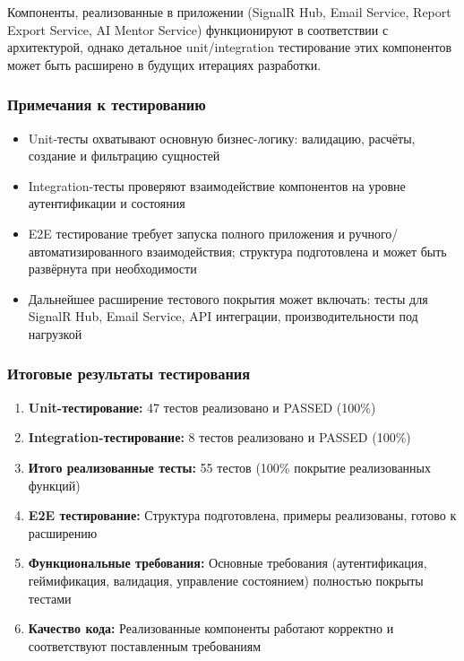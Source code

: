 Компоненты, реализованные в приложении (SignalR Hub, Email Service, Report Export Service, AI Mentor Service) функционируют в соответствии с архитектурой, однако детальное unit/integration тестирование этих компонентов может быть расширено в будущих итерациях разработки.

\subsubsection*{Примечания к тестированию}

\begin{itemize}
	\item Unit-тесты охватывают основную бизнес-логику: валидацию, расчёты, создание и фильтрацию сущностей
	\item Integration-тесты проверяют взаимодействие компонентов на уровне аутентификации и состояния
	\item E2E тестирование требует запуска полного приложения и ручного/автоматизированного взаимодействия; структура подготовлена и может быть развёрнута при необходимости
	\item Дальнейшее расширение тестового покрытия может включать: тесты для SignalR Hub, Email Service, API интеграции, производительности под нагрузкой
\end{itemize}

\subsubsection*{Итоговые результаты тестирования}

\begin{enumerate}
	\item \textbf{Unit-тестирование:} 47 тестов реализовано и PASSED (100\%)
	\item \textbf{Integration-тестирование:} 8 тестов реализовано и PASSED (100\%)
	\item \textbf{Итого реализованные тесты:} 55 тестов (100\% покрытие реализованных функций)
	\item \textbf{E2E тестирование:} Структура подготовлена, примеры реализованы, готово к расширению
	\item \textbf{Функциональные требования:} Основные требования (аутентификация, геймификация, валидация, управление состоянием) полностью покрыты тестами
	\item \textbf{Качество кода:} Реализованные компоненты работают корректно и соответствуют поставленным требованиям
\end{enumerate}
